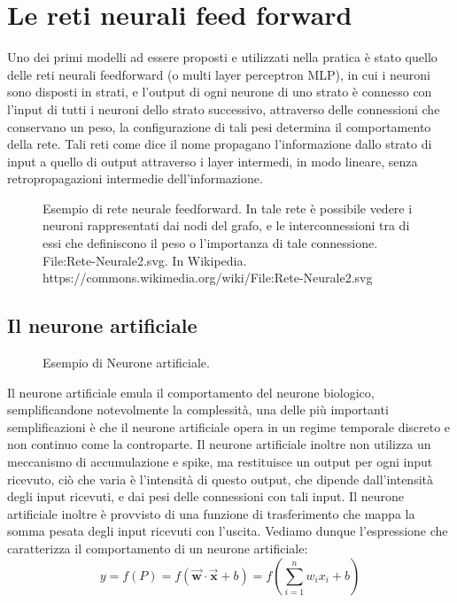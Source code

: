 \section{Le reti neurali feed forward}

Uno dei primi modelli ad essere proposti e utilizzati nella pratica è stato quello delle reti neurali feedforward (o multi layer perceptron MLP),
in cui i neuroni sono disposti in strati, e l'output di ogni neurone di uno strato è connesso con l'input di tutti i neuroni dello strato successivo, 
attraverso delle connessioni che conservano un peso, la configurazione di tali pesi determina il comportamento della rete.
Tali reti come dice il nome propagano l'informazione dallo strato di input a quello di output attraverso i layer intermedi,
in modo lineare, senza retropropagazioni intermedie dell'informazione.

    \begin{figure}[H]
        \centering
        
        \caption{Esempio di rete neurale feedforward. In tale rete è possibile vedere i neuroni rappresentati dai nodi del grafo, e
        le interconnessioni tra di essi che definiscono il peso o l'importanza di tale connessione.\\
        File:Rete-Neurale2.svg. In Wikipedia. https://commons.wikimedia.org/wiki/File:Rete-Neurale2.svg}
        \label{fig:feedforward_nn}
    \end{figure}

\subsection{Il neurone artificiale}

    \begin{figure}
        \centering
        \vspace{-25pt}
        
        \caption{Esempio di Neurone artificiale.}
        \label{fig:artificial_neuron}
        \vspace{0pt}
    \end{figure}

Il neurone artificiale emula il comportamento del neurone biologico, semplificandone notevolmente la complessità,
una delle più importanti semplificazioni è che il neurone artificiale opera in un regime temporale discreto e non continuo come la controparte.
Il neurone artificiale inoltre non utilizza un meccanismo di accumulazione e spike, ma restituisce un output per ogni input ricevuto,
ciò che varia è l'intensità di questo output, che dipende dall'intensità degli input ricevuti, e dai pesi delle connessioni con tali input.
Il neurone artificiale inoltre è provvisto di una funzione di trasferimento che mappa la somma pesata degli input ricevuti con l'uscita.
Vediamo dunque l'espressione che caratterizza il comportamento di un neurone artificiale:
\begin{equation}
    \label{eq:neuron}
    y = f(P) = f(\vec{\mathbf{w}} \cdot \vec{\mathbf{x}} + b) = f(\sum_{i=1}^{n} w_i x_i + b)
\end{equation}

